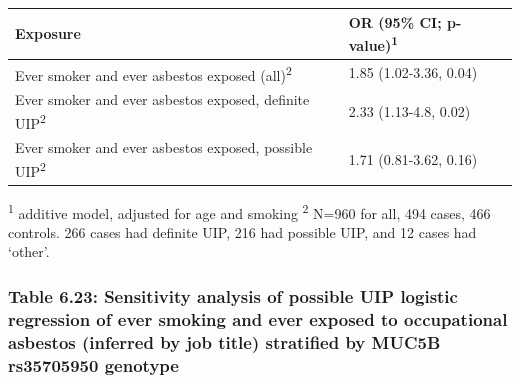 \begin{longtable}[]{@{}ll@{}}
\toprule
\begin{minipage}[b]{0.64\columnwidth}\raggedright
Exposure\strut
\end{minipage} & \begin{minipage}[b]{0.30\columnwidth}\raggedright
OR (95\% CI; p-value)\textsuperscript{1}\strut
\end{minipage}\tabularnewline
\midrule
\endhead
\begin{minipage}[t]{0.64\columnwidth}\raggedright
Ever smoker and ever asbestos exposed (all)\textsuperscript{2}\strut
\end{minipage} & \begin{minipage}[t]{0.30\columnwidth}\raggedright
1.85 (1.02-3.36, 0.04)\strut
\end{minipage}\tabularnewline
\begin{minipage}[t]{0.64\columnwidth}\raggedright
Ever smoker and ever asbestos exposed, definite
UIP\textsuperscript{2}\strut
\end{minipage} & \begin{minipage}[t]{0.30\columnwidth}\raggedright
2.33 (1.13-4.8, 0.02)\strut
\end{minipage}\tabularnewline
\begin{minipage}[t]{0.64\columnwidth}\raggedright
Ever smoker and ever asbestos exposed, possible
UIP\textsuperscript{2}\strut
\end{minipage} & \begin{minipage}[t]{0.30\columnwidth}\raggedright
1.71 (0.81-3.62, 0.16)\strut
\end{minipage}\tabularnewline
\bottomrule
\end{longtable}

\textsuperscript{1} additive model, adjusted for age and smoking
\textsuperscript{2} N=960 for all, 494 cases, 466 controls. 266 cases
had definite UIP, 216 had possible UIP, and 12 cases had `other'.

\newpage

\hypertarget{table-6.23-sensitivity-analysis-of-possible-uip-logistic-regression-of-ever-smoking-and-ever-exposed-to-occupational-asbestos-inferred-by-job-title-stratified-by-muc5b-rs35705950-genotype}{%
\subsubsection{Table 6.23: Sensitivity analysis of possible UIP logistic
regression of ever smoking and ever exposed to occupational asbestos
(inferred by job title) stratified by MUC5B rs35705950
genotype}\label{table-6.23-sensitivity-analysis-of-possible-uip-logistic-regression-of-ever-smoking-and-ever-exposed-to-occupational-asbestos-inferred-by-job-title-stratified-by-muc5b-rs35705950-genotype}}

